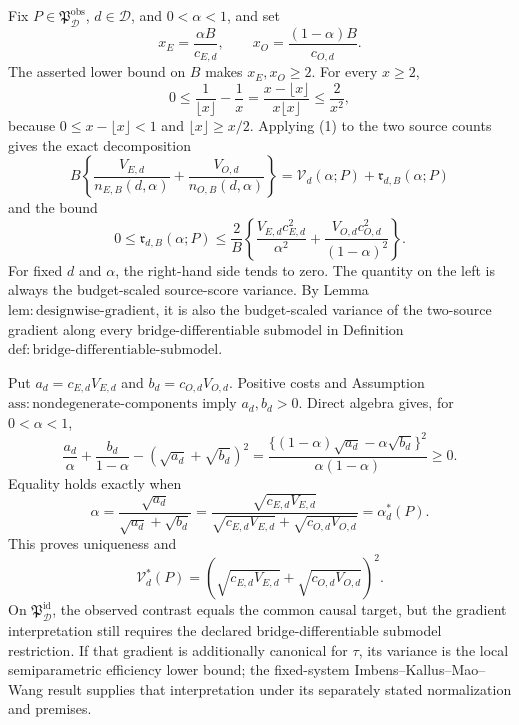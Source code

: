 Fix \(P\in\mathfrak P_{\mathcal D}^{\mathrm{obs}}\), \(d\in\mathcal D\), and \(0<\alpha<1\), and set
\[
 x_E=\frac{\alpha B}{c_{E,d}},\qquad
 x_O=\frac{(1-\alpha)B}{c_{O,d}}.
\]
The asserted lower bound on \(B\) makes \(x_E,x_O\ge2\).  For every \(x\ge2\),
\[
 0\le \frac1{\lfloor x\rfloor}-\frac1x
 =\frac{x-\lfloor x\rfloor}{x\lfloor x\rfloor}
 \le\frac2{x^2}, \tag{1}
\]
because \(0\le x-\lfloor x\rfloor<1\) and \(\lfloor x\rfloor\ge x/2\).  Applying (1) to the two source counts gives the exact decomposition
\[
 B\left\{\frac{V_{E,d}}{n_{E,B}(d,\alpha)}
 +\frac{V_{O,d}}{n_{O,B}(d,\alpha)}\right\}
 =\mathcal V_d(\alpha;P)+\mathfrak r_{d,B}(\alpha;P)
\]
and the bound
\[
 0\le\mathfrak r_{d,B}(\alpha;P)
 \le\frac2B\left\{
 \frac{V_{E,d}c_{E,d}^2}{\alpha^2}
 +\frac{V_{O,d}c_{O,d}^2}{(1-\alpha)^2}\right\}. \tag{2}
\]
For fixed \(d\) and \(\alpha\), the right-hand side tends to zero.  The quantity on the left is always the budget-scaled source-score variance.  By Lemma~\(\mathrm{lem{:}designwise\text{-}gradient}\), it is also the budget-scaled variance of the two-source gradient along every bridge-differentiable submodel in Definition~\(\mathrm{def{:}bridge\text{-}differentiable\text{-}submodel}\).

Put \(a_d=c_{E,d}V_{E,d}\) and \(b_d=c_{O,d}V_{O,d}\).  Positive costs and Assumption~\(\mathrm{ass{:}nondegenerate\text{-}components}\) imply \(a_d,b_d>0\).  Direct algebra gives, for \(0<\alpha<1\),
\[
 \frac{a_d}{\alpha}+\frac{b_d}{1-\alpha}
 -(\sqrt{a_d}+\sqrt{b_d})^2
 =\frac{\{(1-\alpha)\sqrt{a_d}-\alpha\sqrt{b_d}\}^2}
 {\alpha(1-\alpha)}\ge0. \tag{3}
\]
Equality holds exactly when
\[
 \alpha=\frac{\sqrt{a_d}}{\sqrt{a_d}+\sqrt{b_d}}
 =\frac{\sqrt{c_{E,d}V_{E,d}}}
 {\sqrt{c_{E,d}V_{E,d}}+\sqrt{c_{O,d}V_{O,d}}}
 =\alpha_d^*(P).
\]
This proves uniqueness and
\[
 \mathcal V_d^*(P)
 =\left(\sqrt{c_{E,d}V_{E,d}}+\sqrt{c_{O,d}V_{O,d}}\right)^2.
\]
On \(\mathfrak P_{\mathcal D}^{\mathrm{id}}\), the observed contrast equals the common causal target, but the gradient interpretation still requires the declared bridge-differentiable submodel restriction.  If that gradient is additionally canonical for \(\tau\), its variance is the local semiparametric efficiency lower bound; the fixed-system Imbens--Kallus--Mao--Wang result supplies that interpretation under its separately stated normalization and premises.
